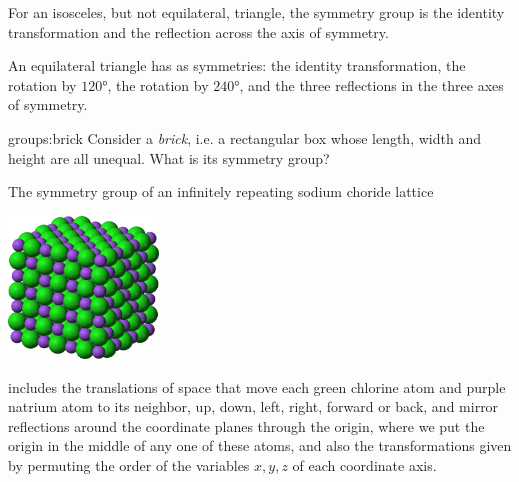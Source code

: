 \begin{example}
For an isosceles, but not equilateral, triangle, the symmetry group is the identity transformation and the reflection across the axis of symmetry.
\end{example}
\begin{example}
An equilateral triangle has as symmetries: the identity transformation, the rotation by \(120\si{\degree}\), the rotation by \(240\si{\degree}\), and the three reflections in the three axes of symmetry.
\end{example}
\begin{problem}{groups:brick}
Consider a \emph{brick}, i.e. a rectangular box whose length, width and height are all unequal.
What is its symmetry group?
\end{problem}
\begin{example}
The symmetry group of an infinitely repeating sodium choride lattice
\begin{center}
\includegraphics[width=4cm]{Sodium-chloride-3D-ionic.png}
\end{center}
includes the translations of space that move each green chlorine atom and purple natrium atom to its neighbor, up, down, left, right, forward or back, and mirror reflections around the coordinate planes through the origin, where we put the origin in the middle of any one of these atoms, and also the transformations given by permuting the order of the variables \(x,y,z\) of each coordinate axis.
\end{example}
